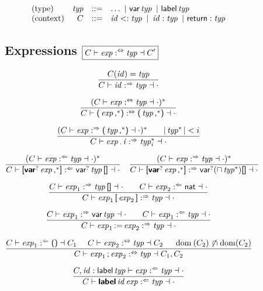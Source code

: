 
\begin{figure*}

$$
\begin{array}{@{}lrcl@{}}
\text{(type)} & \x{typ} & ::= &
  \dots ~|~
  \K{var} \x{typ} ~|~
  \K{label} \x{typ} \\
\text{(context)} & C & ::= &
  \x{id} <: \x{typ} ~|~
  \x{id} : \x{typ} ~|~
  \K{return} : \x{typ}
\end{array}
$$

\subsection*{Expressions \hfill $\boxed{C \vdash \x{exp} \analsynth \x{typ} \dashv C'}$}

$$
\frac{
  C(\x{id}) = \x{typ}
}{
  C \vdash \x{id} \synth \x{typ} \dashv \cdot
}
$$

$$
\frac{
  (C \vdash \x{exp} \analsynth \x{typ} \dashv \cdot)^\ast
}{
  C \vdash \K( \x{exp}\K,^\ast \K) \analsynth \K( \x{typ}\K,^\ast \K) \dashv \cdot
}
$$

$$
\frac{
  (C \vdash \x{exp} \synth \K(\x{typ}\K,^\ast\K) \dashv \cdot)^\ast
  \qquad
  |\x{typ}^\ast| < i
}{
  C \vdash \x{exp} \K. \x{i} \synth \x{typ}^\ast_i \dashv \cdot
}
$$

$$
\frac{
  (C \vdash \x{exp} \anal \x{typ} \dashv \cdot)^\ast
}{
  C \vdash \K[ \KK{var}^? \x{exp}\K,^\ast \K] \anal \K{var}^? \x{typ} \K{[]} \dashv \cdot
}
\quad
\frac{
  (C \vdash \x{exp} \synth \x{typ} \dashv \cdot)^\ast
}{
  C \vdash \K[ \KK{var}^? \x{exp}\K,^\ast \K] \synth \K{var}^? (\sqcap\x{typ}^\ast) \K{[]} \dashv \cdot
}
$$

$$
\frac{
  C \vdash \x{exp}_1 \synth \x{typ}\K{[]} \dashv \cdot
  \qquad
  C \vdash \x{exp}_2 \anal \K{nat} \dashv \cdot
}{
  C \vdash \x{exp}_1 \K[ \x{exp}_2 \K] \synth \x{typ} \dashv \cdot
}
$$

$$
\frac{
  C \vdash \x{exp}_1 \synth \K{var} \x{typ} \dashv \cdot
  \qquad
  C \vdash \x{exp}_1 \anal \x{typ} \dashv \cdot
}{
  C \vdash \x{exp}_1 \K{:=} \x{exp}_2 \synth \x{typ} \dashv \cdot
}
$$

$$
\frac{
  C \vdash \x{exp}_1 \anal \K{()} \dashv C_1
  \quad~
  C \vdash \x{exp}_2 \analsynth \x{typ} \dashv C_2
  \quad~
  \Dom(C_2) \setdisj \Dom(C_2)
}{
  C \vdash \x{exp}_1 \K; \x{exp}_2 \analsynth \x{typ} \dashv C_1, C_2
}
$$

$$
\frac{
  C, \x{id} : \K{label} \x{typ} \vdash \x{exp} \anal \x{typ} \dashv \cdot
}{
  C \vdash \KK{label} \x{id} \x{exp} \anal \x{typ} \dashv \cdot
}
$$


\end{figure*}
